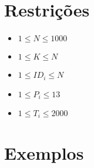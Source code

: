 \section*{Restrições}

\begin{itemize}
\item $1 \leq N \leq 1000$
\item $1 \leq K \leq N$
\item $1 \leq ID_i \leq N$
\item $1 \leq P_i \leq 13$
\item $1 \leq T_i \leq 2000$
\end{itemize}


\section*{Exemplos}

\exemplo
